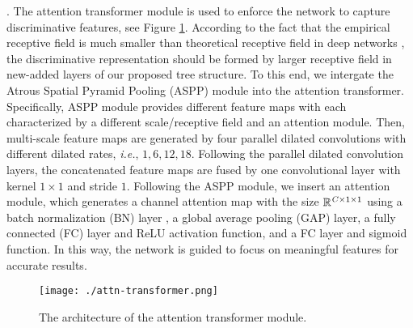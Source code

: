 \documentclass[10pt,twocolumn,letterpaper]{article}
\def\ie{{\em i.e.}}
\begin{document}
{.} The attention transformer module is used to enforce the network to capture discriminative features, see Figure \ref{fig:attn-transformer}. According to the fact that the empirical receptive field is much smaller than theoretical receptive field in deep networks \cite{DBLP:journals/corr/LiuRB15}, the discriminative representation should be formed by larger receptive field in new-added layers of our proposed tree structure. To this end, we intergate the Atrous Spatial Pyramid Pooling (ASPP) module \cite{DBLP:journals/pami/ChenPKMY18} into the attention transformer. Specifically, ASPP module provides different feature maps with each characterized by a different scale/receptive field and an attention module. Then, multi-scale feature maps are generated by four parallel dilated convolutions with different dilated rates, \ie, $1, 6, 12, 18$. Following the parallel dilated convolution layers, the concatenated feature maps are fused by one convolutional layer with kernel $1\times1$ and stride $1$. Following the ASPP module, we insert an attention module, which generates a channel attention map with the size $\mathbb{R}^{{\it C}\times1\times1}$ using a batch normalization (BN) layer \cite{DBLP:conf/icml/IoffeS15}, a global average pooling (GAP) layer, a fully connected (FC) layer and ReLU activation function, and a FC layer and sigmoid function. In this way, the network is guided to focus on meaningful features for accurate results.
\begin{figure}[t]
\centering
\texttt{[image: ./attn-transformer.png]}
\caption{The architecture of the attention transformer module.}
\vspace{-2mm}
\label{fig:attn-transformer}
\end{figure}
\end{document}
